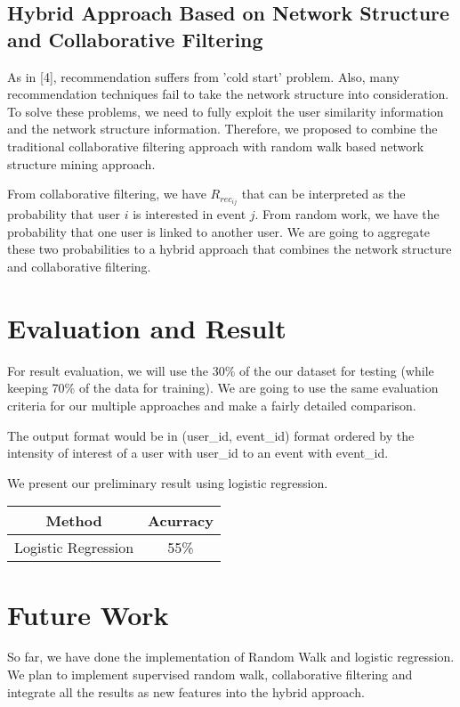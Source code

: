 \documentclass{article}
\begin{document}
\subsection{Hybrid Approach Based on Network Structure and Collaborative Filtering}
As in [4], recommendation suffers from 'cold start' problem. Also, many recommendation techniques fail to take the network structure into consideration. To solve these problems, we need to fully exploit the user similarity information and the network structure information. Therefore, we proposed to combine the traditional collaborative filtering approach with random walk based network structure mining approach. 

From collaborative filtering, we have $R_{rec_{ij}}$ that can be interpreted as the probability that user $i$ is interested in event $j$. From random work, we have the probability that one user is linked to another user. We are going to aggregate these two probabilities to a hybrid approach that combines the network structure and collaborative filtering.


\section{Evaluation and Result}
For result evaluation, we will use the 30\% of the our dataset for testing (while keeping 70\% of the data for training). We are going to use the same evaluation criteria for our multiple approaches and make a fairly detailed comparison.

The output format would be in (user\_id, event\_id) format ordered by the intensity of interest of a user with user\_id to an event with event\_id.


We present our preliminary result using logistic regression.


\begin{center}

\begin{tabular}{|c|c|}
\hline
Method&Acurracy\\ \hline
Logistic Regression&55\% \\ \hline
\end{tabular}
\end{center}


\section{Future Work}
So far, we have done the implementation of Random Walk and logistic regression. We plan to implement supervised random walk, collaborative filtering and integrate all the results as new features into the hybrid approach.
\end{document}
